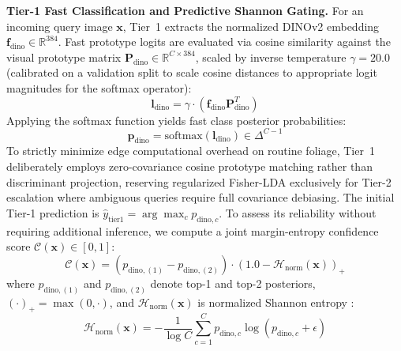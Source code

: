 \documentclass[conference]{IEEEtran}
\begin{document}
\textbf{Tier-1 Fast Classification and Predictive Shannon Gating.} For an incoming query image $\mathbf{x}$, Tier~1 extracts the normalized DINOv2 embedding $\mathbf{f}_{\text{dino}} \in \mathbb{R}^{384}$. Fast prototype logits are evaluated via cosine similarity against the visual prototype matrix $\mathbf{P}_{\text{dino}} \in \mathbb{R}^{C \times 384}$, scaled by inverse temperature $\gamma = 20.0$ (calibrated on a validation split to scale cosine distances to appropriate logit magnitudes for the softmax operator):
\begin{equation}
    \label{eq:tier1_logits}
    \mathbf{l}_{\text{dino}} = \gamma \cdot \left(\mathbf{f}_{\text{dino}} \mathbf{P}_{\text{dino}}^T\right)
\end{equation}
Applying the softmax function yields fast class posterior probabilities:
\begin{equation}
    \label{eq:tier1_softmax}
    \mathbf{p}_{\text{dino}} = \text{softmax}(\mathbf{l}_{\text{dino}}) \in \Delta^{C-1}
\end{equation}
To strictly minimize edge computational overhead on routine foliage, Tier~1 deliberately employs zero-covariance cosine prototype matching rather than discriminant projection, reserving regularized Fisher-LDA exclusively for Tier-2 escalation where ambiguous queries require full covariance debiasing. The initial Tier-1 prediction is $\hat{y}_{\text{tier1}} = \arg\max_c p_{\text{dino}, c}$. To assess its reliability without requiring additional inference, we compute a joint margin-entropy confidence score $\mathcal{C}(\mathbf{x}) \in [0, 1]$:
\begin{equation}
    \label{eq:shannon_gate}
    \mathcal{C}(\mathbf{x}) = \left(p_{\text{dino}, (1)} - p_{\text{dino}, (2)}\right) \cdot \left(1.0 - \mathcal{H}_{\text{norm}}(\mathbf{x})\right)_+
\end{equation}
where $p_{\text{dino}, (1)}$ and $p_{\text{dino}, (2)}$ denote top-1 and top-2 posteriors, $(\cdot)_+ = \max(0, \cdot)$, and $\mathcal{H}_{\text{norm}}(\mathbf{x})$ is normalized Shannon entropy \cite{shannon1948mathematical}:
\begin{equation}
    \mathcal{H}_{\text{norm}}(\mathbf{x}) = -\frac{1}{\log C} \sum_{c=1}^C p_{\text{dino}, c} \log(p_{\text{dino}, c} + \epsilon)
\end{equation}
\end{document}

